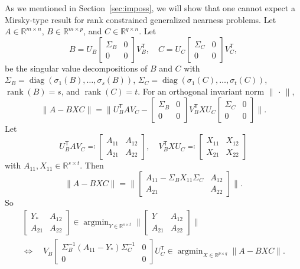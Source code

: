 \documentclass[11pt,reqno]{amsart}
\newcommand{\tp}{{\scriptscriptstyle\mathsf{T}}}
\DeclareMathOperator{\rank}{rank}
\DeclareMathOperator{\diag}{diag}
\DeclareMathOperator*{\argmin}{argmin}
\theoremstyle{definition}
\numberwithin{equation}{section}
\newcommand{\R}{\mathbb{R}}
\begin{document}
As we mentioned in Section~\ref{sec:imposs}, we will show that one cannot expect a Mirsky-type result \cite[Theorem~2]{mir} for rank constrained generalized nearness problems. Let $ A\in \R^{m \times n}$, $B \in \R^{m \times p}$, and $C \in \R^{q \times n}$. Let
\[
B=U_B\begin{bmatrix}
    \Sigma_B & 0 \\
0 & 0
\end{bmatrix} V_B^\tp, \quad C=U_C\begin{bmatrix}
    \Sigma_C & 0 \\
0 & 0
\end{bmatrix} V_C^\tp,
\]
be the singular value decompositions of $B$ and $C$ with $\Sigma_B = \diag(\sigma_1(B),\dots,\sigma_{s}(B))$, $\Sigma_C = \diag(\sigma_1(C),\dots,\sigma_{t}(C))$, $\rank(B) = s$, and $\rank(C) = t$. For an orthogonal invariant norm $\lVert\,\cdot\,\rVert$,
\[
    \lVert A-BXC \rVert = \biggl \lVert U^\tp_B A V_C - \begin{bmatrix}
    \Sigma_B & 0 \\
0 & 0
\end{bmatrix} V_B^\tp X  U_C\begin{bmatrix}
   \Sigma_C & 0 \\
0 & 0
\end{bmatrix}\biggr\rVert.
\]
Let
\begin{equation}\label{eq:equiv1}
    U^\tp_B A V_C \eqqcolon \begin{bmatrix}
        A_{11} & A_{12} \\
    A_{21} & A_{22}
    \end{bmatrix}, \quad 
    V^\tp_B X U_C \eqqcolon \begin{bmatrix}
        X_{11} & X_{12} \\
    X_{21} & X_{22}
    \end{bmatrix}
\end{equation}
with $A_{11},X_{11}\in \R^{s \times t}$. Then
\begin{equation}\label{eq:equiv2}
    \lVert A-BXC \rVert = \biggl\lVert \begin{bmatrix}
        A_{11}-\Sigma_B X_{11}\Sigma_C & A_{12} \\
    A_{21} & A_{22}
    \end{bmatrix} \biggr\rVert.
\end{equation}
So
\begin{multline}\label{eq:completion}
\begin{bmatrix}
    Y_* & A_{12} \\
A_{21} & A_{22}
\end{bmatrix}  \in
    \argmin_{Y \in \R^{s \times t}} \biggl\lVert \begin{bmatrix}
    Y & A_{12} \\
A_{21} & A_{22}
\end{bmatrix} \biggr\rVert
\\
\Longleftrightarrow
\quad
 V_B
\begin{bmatrix}
    \Sigma_B^{-1}(A_{11}-Y_*)\Sigma_C^{-1} & 0 \\
0 & 0
\end{bmatrix}
U_C^\tp \in
    \argmin_{X \in \R^{p \times q}} \lVert A- BXC\rVert.
\end{multline}
\end{document}
